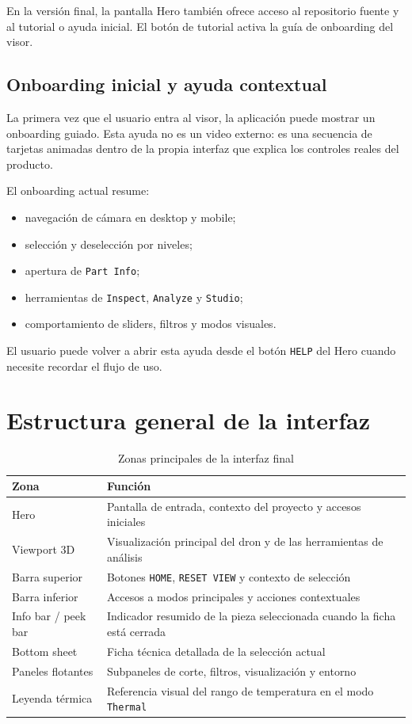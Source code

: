 \documentclass[12pt,letterpaper]{article}
\begin{document}
\noindent En la versión final, la pantalla Hero también ofrece acceso al repositorio fuente y al tutorial o ayuda inicial. El botón de tutorial activa la guía de onboarding del visor.

\subsection{Onboarding inicial y ayuda contextual}
La primera vez que el usuario entra al visor, la aplicación puede mostrar un onboarding guiado. Esta ayuda no es un video externo: es una secuencia de tarjetas animadas dentro de la propia interfaz que explica los controles reales del producto.

El onboarding actual resume:
\begin{itemize}
    \item navegación de cámara en desktop y mobile;
    \item selección y deselección por niveles;
    \item apertura de \texttt{Part Info};
    \item herramientas de \texttt{Inspect}, \texttt{Analyze} y \texttt{Studio};
    \item comportamiento de sliders, filtros y modos visuales.
\end{itemize}

\noindent El usuario puede volver a abrir esta ayuda desde el botón \texttt{HELP} del Hero cuando necesite recordar el flujo de uso.

\section{Estructura general de la interfaz}

\begin{table}[htbp!]
\centering
\caption{Zonas principales de la interfaz final}
\begin{tabular}{p{4.2cm}p{9.5cm}}
\toprule
\textbf{Zona} & \textbf{Función} \\
\midrule
Hero & Pantalla de entrada, contexto del proyecto y accesos iniciales \\
Viewport 3D & Visualización principal del dron y de las herramientas de análisis \\
Barra superior & Botones \texttt{HOME}, \texttt{RESET VIEW} y contexto de selección \\
Barra inferior & Accesos a modos principales y acciones contextuales \\
Info bar / peek bar & Indicador resumido de la pieza seleccionada cuando la ficha está cerrada \\
Bottom sheet & Ficha técnica detallada de la selección actual \\
Paneles flotantes & Subpaneles de corte, filtros, visualización y entorno \\
Leyenda térmica & Referencia visual del rango de temperatura en el modo \texttt{Thermal} \\
\bottomrule
\end{tabular}
\end{table}
\end{document}
